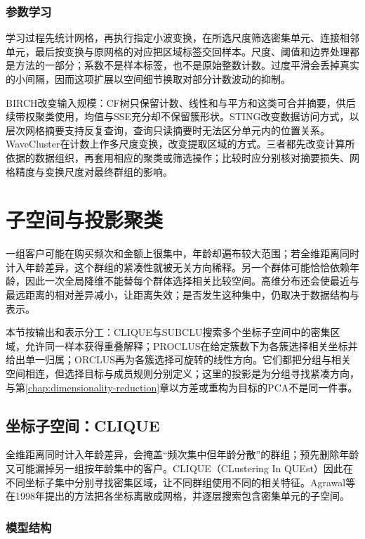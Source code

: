 \subsubsection{参数学习}

学习过程先统计网格，再执行指定小波变换，在所选尺度筛选密集单元、连接相邻单元，最后按变换与原网格的对应把区域标签交回样本。尺度、阈值和边界处理都是方法的一部分；系数不是样本标签，也不是原始整数计数。过度平滑会丢掉真实的小间隔，因而这项扩展以空间细节换取对部分计数波动的抑制。

BIRCH改变输入规模：CF树只保留计数、线性和与平方和这类可合并摘要，供后续带权聚类使用，均值与SSE充分却不保留簇形状。STING改变数据访问方式，以层次网格摘要支持反复查询，查询只读摘要时无法区分单元内的位置关系。WaveCluster在计数上作多尺度变换，改变提取区域的方式。三者都先改变计算所依据的数据组织，再套用相应的聚类或筛选操作；比较时应分别核对摘要损失、网格精度与变换尺度对最终群组的影响。
\section{子空间与投影聚类}
\label{sec:clustering-subspace}

一组客户可能在购买频次和金额上很集中，年龄却遍布较大范围；若全维距离同时计入年龄差异，这个群组的紧凑性就被无关方向稀释。另一个群体可能恰恰依赖年龄，因此一次全局降维不能替每个群体选择相关比较空间。高维分布还会使最近与最远距离的相对差异减小，让距离失效；是否发生这种集中，仍取决于数据结构与表示。

本节按输出和表示分工：CLIQUE与SUBCLU搜索多个坐标子空间中的密集区域，允许同一样本获得重叠解释；PROCLUS在给定簇数下为各簇选择相关坐标并给出单一归属；ORCLUS再为各簇选择可旋转的线性方向。它们都把分组与相关空间相连，但选择目标与成员规则分别定义；这里的投影是为分组寻找紧凑方向，与第\ref{chap:dimensionality-reduction}章以方差或重构为目标的PCA不是同一件事。

\subsection{坐标子空间：CLIQUE}
\label{sec:clustering-clique}

全维距离同时计入年龄差异，会掩盖“频次集中但年龄分散”的群组；预先删除年龄又可能漏掉另一组按年龄集中的客户。CLIQUE（CLustering In QUEst）因此在不同坐标子集中分别寻找密集区域，让不同群组使用不同的相关特征。Agrawal等在1998年提出的方法把各坐标离散成网格，并逐层搜索包含密集单元的子空间。

\subsubsection{模型结构}

